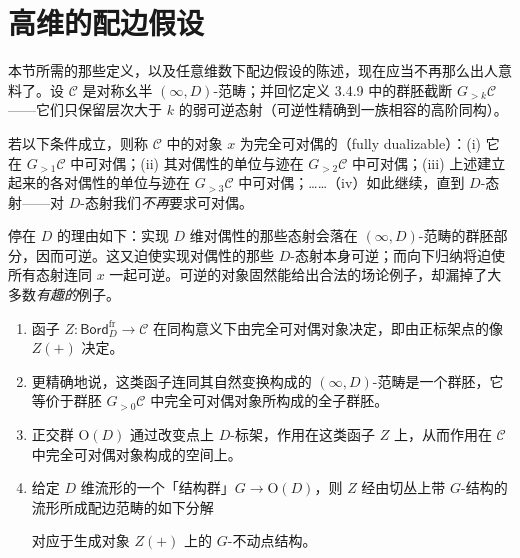 \usetikzlibrary{patterns}

\section{高维的配边假设}
\label{sec:3.5}

本节所需的那些定义，以及任意维数下配边假设的陈述，现在应当不再那么出人意料了。设 $\mathcal{C}$ 是对称幺半 $(\infty,D)$-范畴；并回忆定义 3.4.9 中的群胚截断 $G_{>k}\mathcal{C}$——它们只保留层次大于 $k$ 的弱可逆态射（可逆性精确到一族相容的高阶同构）。

\begin{definition}[Lurie]
若以下条件成立，则称 $\mathcal{C}$ 中的对象 $x$ 为完全可对偶的（fully dualizable）：(i) 它在 $G_{>1}\mathcal{C}$ 中可对偶；(ii) 其对偶性的单位与迹在 $G_{>2}\mathcal{C}$ 中可对偶；(iii) 上述建立起来的各对偶性的单位与迹在 $G_{>3}\mathcal{C}$ 中可对偶；……（iv）如此继续，直到 $D$-态射——对 $D$-态射我们\emph{不再}要求可对偶。
\end{definition}

停在 $D$ 的理由如下：实现 $D$ 维对偶性的那些态射会落在 $(\infty,D)$-范畴的群胚部分，因而可逆。这又迫使实现对偶性的那些 $D$-态射本身可逆；而向下归纳将迫使所有态射连同 $x$ 一起可逆。可逆的对象固然能给出合法的场论例子，却漏掉了大多数\emph{有趣的}例子。

\begin{theorem}[Lurie, {[19]}]
\begin{enumerate}[label=\arabic*., leftmargin=2.2em, itemsep=0.3em]
\item 函子 $Z\colon\mathsf{Bord}^{\mathrm{fr}}_D\to\mathcal{C}$ 在同构意义下由完全可对偶对象决定，即由正标架点的像 $Z(+)$ 决定。
\item 更精确地说，这类函子连同其自然变换构成的 $(\infty,D)$-范畴是一个群胚，它等价于群胚 $G_{>0}\mathcal{C}$ 中完全可对偶对象所构成的全子群胚。
\item 正交群 $\mathrm{O}(D)$ 通过改变点上 $D$-标架，作用在这类函子 $Z$ 上，从而作用在 $\mathcal{C}$ 中完全可对偶对象构成的空间上。
\item 给定 $D$ 维流形的一个「结构群」$G\to\mathrm{O}(D)$，则 $Z$ 经由切丛上带 $G$-结构的流形所成配边范畴的如下分解
\begin{center}
\end{center}
对应于生成对象 $Z(+)$ 上的 $G$-不动点结构。
\end{enumerate}
\end{theorem}

